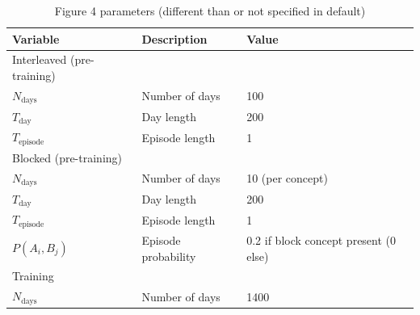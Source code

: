 \documentclass{article}
\begin{document}
\begin{table}[ht]
\centering
\caption{Figure 4 parameters (different than or not specified in default)}
\label{tab:figure_4}
\begin{tabular}{lll}
\toprule
\textbf{Variable} & \textbf{Description} & \textbf{Value} \\
\midrule
Interleaved (pre-training) \\
$N_\textrm{days}$ & Number of days & 100 \\
$T_\textrm{day}$ & Day length & 200 \\
$T_\textrm{episode}$ & Episode length & 1 \\
\midrule
Blocked (pre-training) \\
$N_\textrm{days}$ & Number of days & 10 (per concept)\\
$T_\textrm{day}$ & Day length & 200  \\
$T_\textrm{episode}$ & Episode length & 1 \\
$P(A_i, B_j)$ & Episode probability & 0.2 if block concept present (0 else) \\
\midrule
Training \\
$N_\textrm{days}$ & Number of days & 1400 \\
\bottomrule
\end{tabular}
\end{table}
\end{document}
